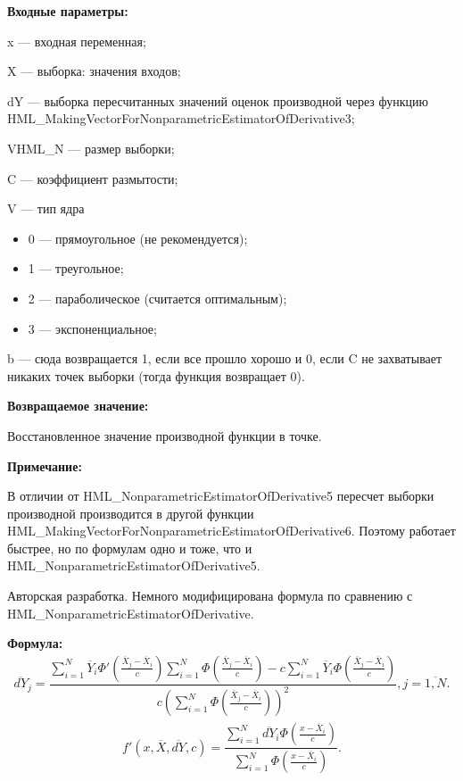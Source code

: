 \textbf{Входные параметры:} 
 
x --- входная переменная;
 
X --- выборка: значения входов;
 
dY --- выборка пересчитанных значений оценок производной через функцию HML\_MakingVectorForNonparametricEstimatorOfDerivative3;
 
VHML\_N --- размер выборки;
 
C --- коэффициент размытости;
 
V --- тип ядра
 
 \begin{itemize}
 \item  0 --- прямоугольное (не рекомендуется);
 \item  1 --- треугольное;
 \item  2 --- параболическое (считается оптимальным);
 \item  3 --- экспоненциальное;
 \end{itemize}
 
b --- сюда возвращается 1, если все прошло хорошо и 0, если C не захватывает никаких точек выборки (тогда функция возвращает 0).

\textbf{Возвращаемое значение:}
 
 Восстановленное значение производной функции в точке.
 
\textbf{Примечание:}

В отличии от HML\_NonparametricEstimatorOfDerivative5 пересчет выборки производной производится в другой функции HML\_MakingVectorForNonparametricEstimatorOfDerivative6. Поэтому работает быстрее, но по формулам одно и тоже, что и HML\_NonparametricEstimatorOfDerivative5.

Авторская разработка. Немного модифицирована формула по сравнению с HML\_NonparametricEstimatorOfDerivative.

\textbf{Формула:}
\begin{eqnarray*}
\overline{dY}_j =\dfrac{\sum_{i=1}^{N}\overline{Y}_i{\Phi}'\left( \frac{\overline{X}_j-\overline{X}_i}{c}\right) \sum_{i=1}^{N}\Phi\left( \frac{\overline{X}_j-\overline{X}_i}{c}\right)-c \sum_{i=1}^{N}\overline{Y}_i\Phi\left( \frac{\overline{X}_j-\overline{X}_i}{c}\right)}{c\left( \sum_{i=1}^{N}\Phi\left( \frac{\overline{X}_j-\overline{X}_i}{c}\right)\right)^2 }, j=\overline{1,N}.
\end{eqnarray*}
\begin{eqnarray*}
{f}'\left( x, \overline{X},\overline{dY}, c\right) =\dfrac{\sum_{i=1}^{N}\overline{dY}_i\Phi\left( \frac{x-\overline{X}_i}{c}\right) }{\sum_{i=1}^{N}\Phi\left( \frac{x-\overline{X}_i}{c}\right) }.
\end{eqnarray*}

